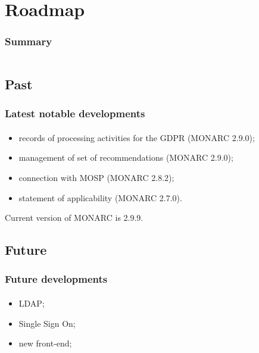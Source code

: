%
%
\section{Roadmap}
\begin{frame}
    \frametitle{Summary}
    \begin{columns}[t]
        \begin{column}{5cm}
            \tableofcontents[sections={1-3}, currentsection, hideothersubsections]
        \end{column}
        \begin{column}{5cm}
            \tableofcontents[sections={4-6}, currentsection, hideothersubsections]
        \end{column}
    \end{columns}
\end{frame}

\subsection{Past}
\begin{frame}
    \frametitle{Latest notable developments}
    \framesubtitle{}
    \begin{itemize}
        \item records of processing activities for the GDPR (MONARC 2.9.0);
        \item management of set of recommendations (MONARC 2.9.0);
        \item connection with MOSP (MONARC 2.8.2);
        \item statement of applicability (MONARC 2.7.0).
    \end{itemize}
    \bigskip
    Current version of MONARC is 2.9.9.
\end{frame}

\subsection{Future}
\begin{frame}
    \frametitle{Future developments}
    \framesubtitle{}
    \begin{itemize}
        \item LDAP;
        \item Single Sign On;
        \item new front-end;
    \end{itemize}
\end{frame}
